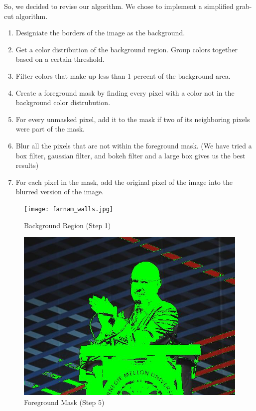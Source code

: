 \documentclass[12pt]{article}
\begin{document}
So, we decided to revise our algorithm. We chose to implement a simplified
grab-cut algorithm.
\begin{enumerate}
    \item
        Designiate the borders of the image as the background.
    \item
        Get a color distribution of the background region. Group colors together
        based on a certain threshold.
    \item
        Filter colors that make up less than 1 percent of the background area.
    \item
        Create a foreground mask by finding every pixel with a color not
        in the background color distrubution.
    \item
        For every unmasked pixel, add it to the mask if two of its neighboring
        pixels were part of the mask.
    \item
        Blur all the pixels that are not within the foreground mask. (We have
        tried a box filter, gaussian filter, and bokeh filter and a large box
        gives us the best results)
    \item
        For each pixel in the mask, add the original pixel of the image into
        the blurred version of the image.
\end{enumerate}

\begin{figure}[!htb]
    \begin{minipage}{0.48\textwidth}
        \centering
        \texttt{[image: farnam\_walls.jpg]}
        \caption{Background Region (Step 1)}
    \end{minipage}\hfill
    \begin{minipage}{0.48\textwidth}
        \centering
        \includegraphics[width=0.9\linewidth]{farnam_dude.jpg}
        \caption{Foreground Mask (Step 5)}
    \end{minipage}\hfill
\end{figure}
\end{document}
